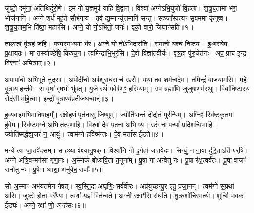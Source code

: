 \clearpage
{}
\setcounter{anuvakam}{0}

जुष्टो॒ दमू॑ना॒ अति॑थिर्दुरो॒णे।
इ॒मं नो॑ य॒ज्ञमुप॑ याहि वि॒द्वान्।
विश्वा॑ अग्ने\-ऽभि॒युजो॑ वि॒हत्य॑।
श॒त्रू॒य॒तामा भ॑रा॒ भोज॑नानि।
अग्ने॒ शर्ध॑ मह॒ते सौभ॑गाय।
तव॑ द्यु॒म्नान्यु॑त्त॒मानि॑ सन्तु।
सञ्जा᳚स्प॒त्यꣳ सु॒यम॒मा कृ॑णुष्व।
श॒त्रू॒य॒ताम॒भि ति॑ष्ठा॒ महाꣳ॑सि।
अग्ने॒ यो नो॒\-ऽभितो॒ जनः॑।
वृको॒ वारो॒ जिघाꣳ॑सति॥१॥\ip

ताꣴस्त्वं वृ॑त्रहं जहि।
वस्व॒स्मभ्य॒मा भ॑र।
अग्ने॒ यो नो॑\-ऽभि॒दास॑ति।
स॒मा॒नो यश्च॒ निष्ट्यः॑।
इ॒ध्मस्ये॑व प्र॒क्षाय॑तः।
मा तस्योच्छे॑षि॒ किञ्च॒न।
त्वमि॑न्द्राभि॒भूर॑सि।
दे॒वो विज्ञा॑तवीर्यः।
वृ॒त्र॒हा पु॑रु॒चेत॑नः।
अप॒ प्राच॑ इन्द्र॒ विश्वाꣳ॑ अ॒मित्रान्॑॥२॥\ip

अपापा॑चो अभिभूते नुदस्व।
अपोदी॑चो॒ अप॑शूराध॒रा च॑ ऊ॒रौ।
यथा॒ तव॒ शर्म॒न्मदे॑म।
तमिन्द्रं॑ वाजयामसि।
म॒हे वृ॒त्राय॒ हन्त॑वे।
स वृषा॑ वृष॒भो भु॑वत्।
यु॒जे रथं॑ ग॒वेष॑ण॒ꣳ॒ हरि॑भ्याम्।
उप॒ ब्रह्मा॑णि जुजुषा॒णम॑स्थुः।
विबा॑धिष्टा॒स्य रोद॑सी महि॒त्वा।
इन्द्रो॑ वृ॒त्राण्य॑प्र॒तीज॑घ॒न्वान्॥३॥\ip

ह॒व्य॒वाह॑मभिमाति॒षाहम्᳚।
र॒क्षो॒हणं॒ पृत॑नासु जि॒ष्णुम्।
ज्योति॑ष्मन्तं॒ दीद्य॑तं॒ पुर॑न्धिम्।
अ॒ग्निꣴ स्वि॑ष्ट॒कृत॒मा हु॑वेम।
स्वि॑ष्टमग्ने अ॒भि तत्पृ॑णाहि।
विश्वा॑ देव॒ पृत॑ना अ॒भि ष्य।
उ॒रुं नः॒ पन्थां᳚ प्रदि॒शन्विभा॑हि।
ज्योति॑ष्मद्धेह्य॒जरं॑ न॒ आयुः॑।
त्वाम॑ग्ने ह॒विष्म॑न्तः।
दे॒वं मर्ता॑स ईडते॥४॥\ip

मन्ये᳚ त्वा जा॒तवे॑दसम्।
स ह॒व्या व॑क्ष्यानु॒षक्।
विश्वा॑नि नो दु॒र्गहा॑ जातवेदः।
सिन्धुं॒ न ना॒वा दु॑रि॒ताऽति॑ पर्‌\mbox{}षि।
अग्ने॑ अत्रि॒वन्मन॑सा गृणा॒नः।
अ॒स्माकं॑ बोध्यवि॒ता त॒नूना᳚म्।
पू॒षा गा अन्वे॑तु नः।
पू॒षा र॑क्ष॒त्वर्व॑तः।
पू॒षा वाजꣳ॑ सनोतु नः।
पू॒षेमा आशा॒ अनु॑वेद॒ सर्वाः᳚॥५॥\ip

सो अ॒स्माꣳ अभ॑यतमेन नेषत्।
स्व॒स्ति॒दा अघृ॑णिः॒ सर्व॑वीरः।
अप्र॑युच्छन्पु॒र ए॑तु॒ प्रजा॒नन्।
त्वम॑ग्ने स॒प्रथा॑ असि।
जुष्टो॒ होता॒ वरे᳚ण्यः।
त्वया॑ य॒ज्ञं वित॑न्वते।
अ॒ग्नी रक्षाꣳ॑सि सेधति।
शु॒क्र\-शो॑चि॒रम॑र्त्यः।
शुचिः॑ पाव॒क ईड्यः॑।
अग्ने॒ रक्षा॑ णो॒ अꣳह॑सः॥६॥\ip

